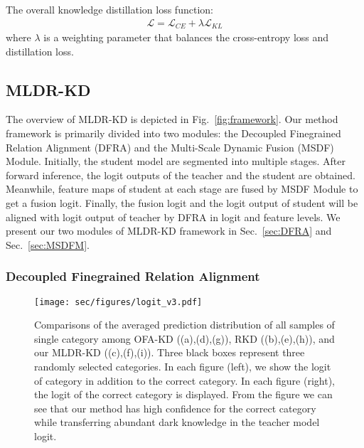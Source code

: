 The overall knowledge distillation loss function: 
\begin{equation}
    \begin{aligned}
        \mathcal{L} = \mathcal{L}_{CE}+\lambda \mathcal{L}_{KL}
    \end{aligned}
\end{equation}
where $\lambda$ is a weighting parameter that balances the cross-entropy loss and distillation loss.

\subsection{MLDR-KD}
The overview of MLDR-KD is depicted in Fig.~\ref{fig:framework}. Our method framework is primarily divided into two modules: the Decoupled Finegrained Relation Alignment (DFRA) and the Multi-Scale Dynamic Fusion (MSDF) Module. Initially, the student model are segmented into multiple stages. After forward inference, the logit outputs of the teacher and the student are obtained. Meanwhile, feature maps of student at each stage are fused by MSDF Module to get a fusion logit. Finally, the fusion logit and the logit output of student will be aligned with logit output of teacher by DFRA in logit and feature levels. We present our two modules of MLDR-KD framework in Sec.~\ref{sec:DFRA} and Sec.~\ref{sec:MSDFM}.

\subsubsection{Decoupled Finegrained Relation Alignment}

\begin{figure*}[t]
  \centering
  \texttt{[image: sec/figures/logit\_v3.pdf]}
  \vspace{-6mm}
  \caption{Comparisons of the averaged prediction distribution of all samples of single category among OFA-KD ((a),(d),(g)), RKD ((b),(e),(h)), and our MLDR-KD ((c),(f),(i)). Three black boxes represent three randomly selected categories.
  In each figure (left), we show the logit of category in addition to the correct category. In each figure (right), the logit of the correct category is displayed. From  the figure we can see that our method has 
high confidence for the correct category while transferring abundant dark knowledge in the teacher model logit.
  }
  \label{fig:logit}  
  \vspace{-4mm}
\end{figure*}

